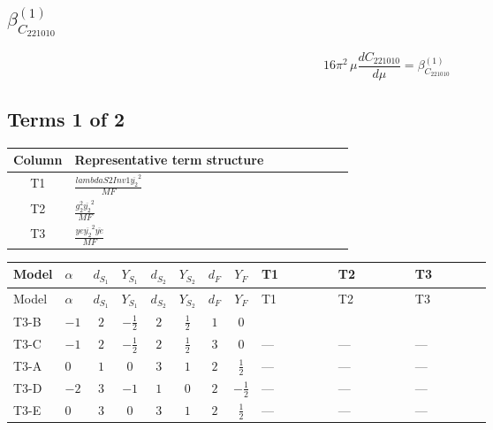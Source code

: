 \documentclass[8pt]{article}
\begin{document}
\begin{landscape}
\section*{$\beta_{C_{221010}}^{(1)}$}
\[16\pi^2\,\mu\frac{d C_{221010}}{d\mu}=\beta_{C_{221010}}^{(1)}\]
\subsection*{Terms 1 of 2}
\begin{center}
\begin{tabular}{@{}c >{\raggedright\arraybackslash}p{0.82\linewidth}@{}}
\toprule
Column & Representative term structure \\
\midrule
T1 & \(\displaystyle \frac{lambdaS2Inv1 \overline{y_{2}}^{2}}{MF}\) \\
\midrule
T2 & \(\displaystyle \frac{g_{2}^{2} \overline{y_{2}}^{2}}{MF}\) \\
\midrule
T3 & \(\displaystyle \frac{ye \overline{y_{2}}^{2} \overline{ye}}{MF}\) \\
\midrule
\bottomrule
\end{tabular}
\end{center}
\smallskip
\tiny
\begin{longtable}{@{}llcccccc >{\raggedright\arraybackslash}p{0.21\linewidth} >{\raggedright\arraybackslash}p{0.21\linewidth} >{\raggedright\arraybackslash}p{0.21\linewidth}@{}}
\toprule
Model & $\alpha$ & $d_{S_1}$ & $Y_{S_1}$ & $d_{S_2}$ & $Y_{S_2}$ & $d_F$ & $Y_F$ & T1 & T2 & T3 \\
\midrule
\endfirsthead
\toprule
Model & $\alpha$ & $d_{S_1}$ & $Y_{S_1}$ & $d_{S_2}$ & $Y_{S_2}$ & $d_F$ & $Y_F$ & T1 & T2 & T3 \\
\midrule
\endhead
T3-B & $-1$ & $2$ & $-\frac{1}{2}$ & $2$ & $\frac{1}{2}$ & $1$ & $0$ & \scriptsize\adjustbox{max width=\linewidth}{$\begin{gathered} \frac{lambdaS2Inv1 \overline{y_{2}}^{2}}{2 MF}\end{gathered}$} & \scriptsize\adjustbox{max width=\linewidth}{$\begin{gathered} \frac{3 g_{2}^{2} \overline{y_{2}}^{2}}{4 MF}\end{gathered}$} & \scriptsize\adjustbox{max width=\linewidth}{$\begin{gathered} - \frac{ye \overline{y_{2}}^{2} \overline{ye}}{4 MF}\end{gathered}$} \\
\midrule
T3-C & $-1$ & $2$ & $-\frac{1}{2}$ & $2$ & $\frac{1}{2}$ & $3$ & $0$ & --- & --- & --- \\
\midrule
T3-A & $0$ & $1$ & $0$ & $3$ & $1$ & $2$ & $\frac{1}{2}$ & --- & --- & --- \\
\midrule
T3-D & $-2$ & $3$ & $-1$ & $1$ & $0$ & $2$ & $-\frac{1}{2}$ & --- & --- & --- \\
\midrule
T3-E & $0$ & $3$ & $0$ & $3$ & $1$ & $2$ & $\frac{1}{2}$ & --- & --- & --- \\
\midrule
\bottomrule
\end{longtable}
\clearpage

\end{landscape}
\end{document}
